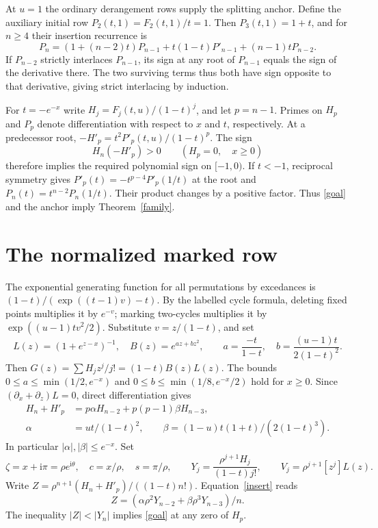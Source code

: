 \documentclass[11pt]{article}
\newcommand{\ii}{\mathrm{i}}
\begin{document}
At \(u=1\) the ordinary derangement rows supply the splitting anchor. Define the auxiliary initial row \(P_2(t,1)=F_2(t,1)/t=1\). Then \(P_3(t,1)=1+t\), and for \(n\ge4\) their insertion recurrence is
\[
 P_n=(1+(n-2)t)P_{n-1}+t(1-t)P'_{n-1}+(n-1)tP_{n-2}.
\]
If \(P_{n-2}\) strictly interlaces \(P_{n-1}\), its sign at any root of \(P_{n-1}\) equals the sign of the derivative there. The two surviving terms thus both have sign opposite to that derivative, giving strict interlacing by induction.

For \(t=-e^{-x}\) write \(H_j=F_j(t,u)/(1-t)^j\), and let \(p=n-1\). Primes on \(H_p\) and \(P_p\) denote differentiation with respect to \(x\) and \(t\), respectively. At a predecessor root, \(-H'_p=t^2P'_p(t,u)/(1-t)^p\). The sign
\begin{equation}\label{goal}
 H_n(-H'_p)>0\qquad(H_p=0,\quad x\ge0)
\end{equation}
therefore implies the required polynomial sign on \([-1,0)\). If \(t<-1\), reciprocal symmetry gives \(P'_p(t)=-t^{p-4}P'_p(1/t)\) at the root and \(P_n(t)=t^{n-2}P_n(1/t)\). Their product changes by a positive factor. Thus \eqref{goal} and the anchor imply Theorem~\ref{family}.

\section{The normalized marked row}
The exponential generating function for all permutations by excedances is \((1-t)/(\exp((t-1)v)-t)\). By the labelled cycle formula, deleting fixed points multiplies it by \(e^{-v}\); marking two-cycles multiplies it by \(\exp((u-1)tv^2/2)\). Substitute \(v=z/(1-t)\), and set
\[
 L(z)=(1+e^{z-x})^{-1},\quad B(z)=e^{az+bz^2},\qquad
 a=\frac{-t}{1-t},\quad b=\frac{(u-1)t}{2(1-t)^2}.
\]
Then \(G(z)=\sum H_j z^j/j!=(1-t)B(z)L(z)\).
The bounds \(0\le a\le\min(1/2,e^{-x})\) and \(0\le b\le\min(1/8,e^{-x}/2)\) hold for \(x\ge0\). Since \((\partial_x+\partial_z)L=0\), direct differentiation gives
\begin{align}
 H_n+H'_p&=p\alpha H_{n-2}+p(p-1)\beta H_{n-3},\label{insert}\\
 \alpha&=ut/(1-t)^2,\qquad \beta=(1-u)t(1+t)/(2(1-t)^3).\nonumber
\end{align}
In particular \(|\alpha|,|\beta|\le e^{-x}\). Set
\[
 \zeta=x+\ii\pi=\rho e^{\ii\theta},\quad c=x/\rho,\quad s=\pi/\rho,\qquad
 Y_j=\frac{\rho^{j+1}H_j}{(1-t)j!},\qquad V_j=\rho^{j+1}[z^j]L(z).
\]
Write \(Z=\rho^{n+1}(H_n+H'_p)/((1-t)n!)\). Equation~\eqref{insert} reads
\[
 Z=(\alpha\rho^2Y_{n-2}+\beta\rho^3Y_{n-3})/n .
\]
The inequality \(|Z|<|Y_n|\) implies \eqref{goal} at any zero of \(H_p\).




\end{document}
